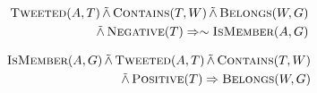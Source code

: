 \begin{align*}
\begin{split}
\textsc{Tweeted}(A,T)
	 \softand \textsc{Contains}(T,W)
	\softand \textsc{Belongs}(W,G)\\
	 \softand \textsc{Negative}(T)
	\Rightarrow \sim \textsc{IsMember}(A,G)
\end{split}
\end{align*}

\begin{align*}
\begin{split}
\textsc{IsMember}(A,G)
	 \softand \textsc{Tweeted}(A,T)
	\softand \textsc{Contains}(T,W)\\
	 \softand \textsc{Positive}(T) 
	\Rightarrow \textsc{Belongs}(W,G)
\end{split}
\end{align*}

